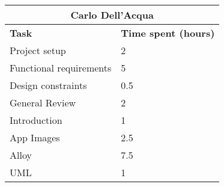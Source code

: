 \begin{table}[h]
  \centering
  \begin{tabular}{l|l}
    \multicolumn{2}{c}{\textbf{Carlo Dell'Acqua}} \\
    \hline
    \textbf{Task} & \textbf{Time spent (hours)}\\
    \hline
    Project setup & 2 \\
    Functional requirements & 5 \\
    Design constraints & 0.5 \\
    General Review & 2 \\
    Introduction & 1 \\
    App Images & 2.5 \\
    Alloy & 7.5 \\
    UML & 1 \\
  \end{tabular}
\end{table}